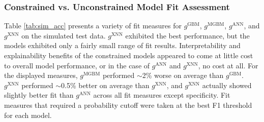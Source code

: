 \documentclass[information,article,accept,moreauthors,pdftex]{Definitions/mdpi}
\begin{document}
\subsubsection{Constrained vs. Unconstrained Model Fit Assessment}\label{ssec:c_v_uc_sim}

Table \ref{tab:sim_acc} presents a variety of fit measures for $g^\text{GBM}$, $g^\text{MGBM}$, $g^\text{ANN}$, and $g^\text{XNN}$ on the simulated test data. $g^\text{XNN}$ exhibited the best performance, but the models exhibited only a fairly small range of fit results. Interpretability and explainability benefits of the constrained models appeared to come at little cost to overall model performance, or in the case of $g^\text{ANN}$ and $g^\text{XNN}$, no cost at all. For the displayed measures, $g^\text{MGBM}$ performed $\sim$2\% worse on average than $g^\text{GBM}$. $g^\text{XNN}$ performed $\sim$0.5\% better on average than $g^\text{XNN}$, and $g^\text{XNN}$ actually showed slightly better fit than $g^\text{ANN}$ across all fit measures except specificity. Fit measures that required a probability cutoff were taken at the best F1 threshold for each model.
\end{document}
